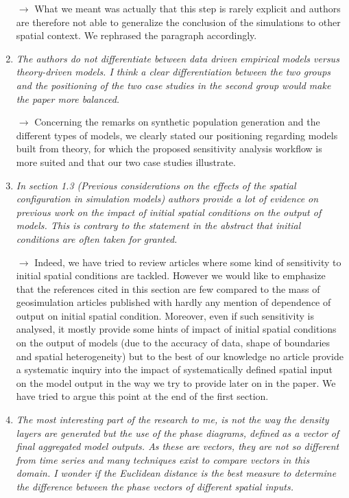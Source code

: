 \documentclass[11pt,a4paper,sans]{moderncv}        %
\begin{document}
\begin{enumerate}
	\medskip
	
	$\rightarrow$ What we meant was actually that this step is rarely explicit and authors are therefore not able to generalize the conclusion of the simulations to other spatial context. We rephrased the paragraph accordingly.
	\bigskip
	
	
	
	\item \textit{The authors do not differentiate between data driven empirical models versus theory-driven models. I think a clear differentiation between the two groups and the positioning of the two case studies in the second group would make the paper more balanced.}
	
	\medskip
	
	$\rightarrow$ Concerning the remarks on synthetic population generation and the different types of models, we clearly stated our positioning regarding models built from theory, for which the proposed sensitivity analysis workflow is more suited and that our two case studies illustrate.
	\bigskip
	
	\item \textit{In section 1.3 (Previous considerations on the effects of the spatial configuration in simulation models) authors provide a lot of evidence on previous work on the impact of initial spatial conditions on the output of models. This is contrary to the statement in the abstract that initial conditions are often taken for granted.}
	
	\medskip
	
	$\rightarrow$ Indeed, we have tried to review articles where some kind of sensitivity to initial spatial conditions are tackled. However we would like to emphasize that the references cited in this section are few compared to the mass of geosimulation articles published with hardly any mention of dependence of output on initial spatial condition. Moreover, even if such sensitivity is analysed, it mostly provide some hints of impact of initial spatial conditions on the output of models (due to the accuracy of data, shape of boundaries and spatial heterogeneity) but to the best of our knowledge no article provide a systematic inquiry into the impact of systematically defined spatial input on the model output in the way we try to provide later on in the paper. We have tried to argue this point at the end of the first section.
	\bigskip

	
	\item \textit{The most interesting part of the research to me, is not the way the density layers are generated but the use of the phase diagrams, defined as a vector of final aggregated model outputs. As these are vectors, they are not so different from time series and many techniques exist to compare vectors in this domain. I wonder if the Euclidean distance is the best measure to determine the difference between the phase vectors of different spatial inputs.}
	

\end{enumerate}
\end{document}
